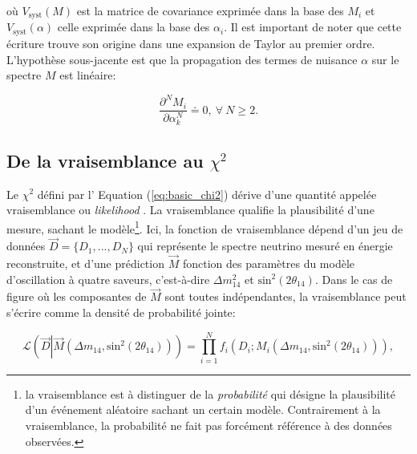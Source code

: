 \bigbreak

où $V_\textrm{syst}(M)$ est la matrice de covariance exprimée dans la base des $M_i$ et $V_\textrm{syst}(\alpha )$ celle exprimée dans la base des $\alpha_i$. Il est important de noter que cette écriture trouve son origine dans une expansion de Taylor au premier ordre. L'hypothèse sous-jacente est que la propagation des termes de nuisance $\alpha$ sur le spectre $M$ est linéaire:

\begin{equation}
    \frac{\partial^N M_{i}}{\partial \alpha_k^N} \doteq 0, \ \forall \ N \geq 2.
\end{equation}

\bigbreak




\subsection{De la vraisemblance au $\chi^2$}

Le $\chi^2$ défini par l' Equation (\ref{eq:basic_chi2}) dérive d'une quantité appelée \og vraisemblance \fg{} ou \og{} \textit{likelihood} \fg{}. La vraisemblance qualifie la plausibilité d'une mesure, sachant le modèle\footnote{la vraisemblance est à distinguer de la \textit{probabilité} qui désigne la plausibilité d'un événement aléatoire sachant un certain modèle. Contrairement à la vraisemblance, la probabilité ne fait pas forcément référence à des données observées.}. Ici, la fonction de vraisemblance dépend d'un jeu de données $ \overrightarrow{D} = \{ D_1, ..., D_N \}$ qui représente le spectre neutrino mesuré en énergie reconstruite, et d'une prédiction $\overrightarrow{M}$ fonction des paramètres du modèle d'oscillation à quatre saveurs, c'est-à-dire $\Delta m_{14}^2$ et $\textrm{sin}^2(2\theta_{14})$. Dans le cas de figure où les composantes de $\overrightarrow{M}$ sont toutes indépendantes, la vraisemblance peut s'écrire comme la densité de probabilité jointe:

\begin{equation}
    \mathcal{L}\left( \overrightarrow{D} \left| \overrightarrow{M} \left(\Delta m_{14}, \textrm{sin}^2(2\theta_{14})\right) \right. \right) =  \prod_{i=1}^{N} f_i(D_i; M_i(\Delta m_{14}, \textrm{sin}^2(2\theta_{14}) )),
\end{equation}

